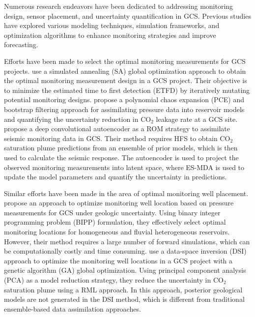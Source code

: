 \documentclass[10pt, twoside]{article}
\begin{document}
Numerous research endeavors have been dedicated to addressing monitoring design, sensor placement, and uncertainty quantification in GCS. Previous studies have explored various modeling techniques, simulation frameworks, and optimization algorithms to enhance monitoring strategies and improve forecasting. 

Efforts have been made to select the optimal monitoring measurements for GCS projects. \citet{Yonkofski2016} use a simulated annealing (SA) global optimization approach to obtain the optimal monitoring measurement design in a GCS project. Their objective is to minimize the estimated time to first detection (ETFD) by iteratively mutating potential monitoring designs. \citet{Oladyshkin2013671} propose a polynomial chaos expansion (PCE) and bootstrap filtering approach for assimilating pressure data into reservoir models and quantifying the uncertainty reduction in CO$_2$ leakage rate at a GCS site. \citet{Liu2020} propose a deep convolutional autoencoder as a ROM strategy to assimilate seismic monitoring data in GCS. Their method requires HFS to obtain CO$_2$ saturation plume predictions from an ensemble of prior models, which is then used to calculate the seismic response. The autoencoder is used to project the observed monitoring measurements into latent space, where ES-MDA is used to update the model parameters and quantify the uncertainty in predictions. 

Similar efforts have been made in the area of optimal monitoring well placement. \citet{Sun2013} propose an approach to optimize monitoring well location based on pressure measurements for GCS under geologic uncertainty. Using binary integer programming problem (BIPP) formulation, they effectively select optimal monitoring locations for homogeneous and fluvial heterogeneous reservoirs. However, their method requires a large number of forward simulations, which can be computationally costly and time consuming. \citet{Sun2019} use a data-space inversion (DSI) approach to optimize the monitoring well locations in a GCS project with a genetic algorithm (GA) global optimization. Using principal component analysis (PCA) as a model reduction strategy, they reduce the uncertainty in CO$_2$ saturation plume using a RML approach. In this approach, posterior geological models are not generated in the DSI method, which is different from traditional ensemble-based data assimilation approaches. 
\end{document}

